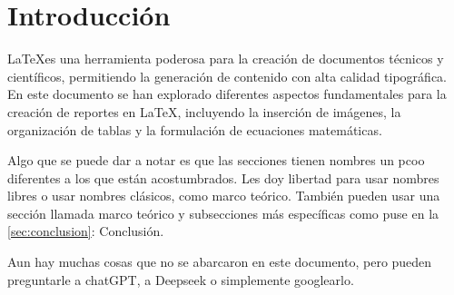 \section{Introducción}
\LaTeX es una herramienta poderosa para la creación de documentos técnicos y científicos, permitiendo la generación de contenido con alta calidad tipográfica. En este documento se han explorado diferentes aspectos fundamentales para la creación de reportes en \LaTeX, incluyendo la inserción de imágenes, la organización de tablas y la formulación de ecuaciones matemáticas.

Algo que se puede dar a notar es que las secciones tienen nombres un pcoo diferentes a los que están acostumbrados. Les doy libertad para usar nombres libres o usar nombres clásicos, como marco teórico. También pueden usar una sección llamada marco teórico y subsecciones más específicas como puse en la \autoref{sec:conclusion}: Conclusión.

Aun hay muchas cosas que no se abarcaron en este documento, pero pueden preguntarle a chatGPT, a Deepseek o simplemente googlearlo. 
